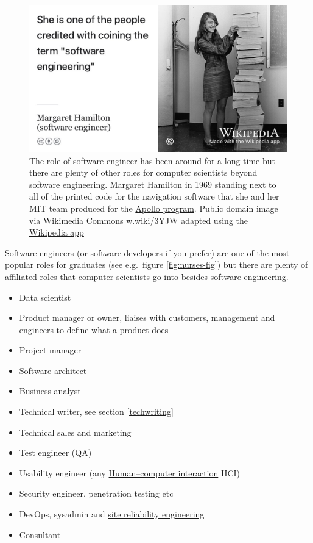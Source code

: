 \documentclass[
]{book}
\providecommand{\tightlist}{%
  \setlength{\itemsep}{0pt}\setlength{\parskip}{0pt}}
\begin{document}
\begin{figure}

{\centering \includegraphics[width=1\linewidth]{images/margaret-hamilton} 

}

\caption{The role of software engineer has been around for a long time but there are plenty of other roles for computer scientists beyond software engineering. \href{https://en.wikipedia.org/wiki/Margaret_Hamilton_(software_engineer)}{Margaret Hamilton} in 1969 standing next to all of the printed code for the navigation software that she and her MIT team produced for the \href{https://en.wikipedia.org/wiki/Apollo_program}{Apollo program}. Public domain image via Wikimedia Commons \href{https://w.wiki/3YJW}{w.wiki/3YJW} adapted using the \href{https://apps.apple.com/us/app/wikipedia/id324715238}{Wikipedia app}}\label{fig:hamilton-fig}
\end{figure}



Software engineers (or software developers if you prefer) are one of the most popular roles for graduates (see e.g.~figure \ref{fig:nurses-fig}) but there are plenty of affiliated roles that computer scientists go into besides software engineering.

\begin{itemize}
\tightlist
\item
  Data scientist
\item
  Product manager or owner, liaises with customers, management and engineers to define what a product does
\item
  Project manager
\item
  Software architect
\item
  Business analyst
\item
  Technical writer, see section \ref{techwriting}
\item
  Technical sales and marketing
\item
  Test engineer (QA)
\item
  Usability engineer (any \href{https://en.wikipedia.org/wiki/Human\%E2\%80\%93computer_interaction}{Human--computer interaction} HCI)
\item
  Security engineer, penetration testing etc
\item
  DevOps, sysadmin and \href{https://en.wikipedia.org/wiki/Site_reliability_engineering}{site reliability engineering}
\item
  Consultant
\end{itemize}
\end{document}
